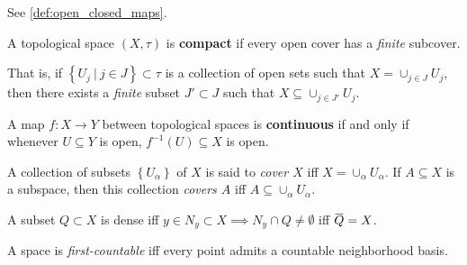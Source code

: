 \begin{definition}

See \cref{def:open_closed_maps}.

\end{definition}

\begin{definition}[Compact]

A topological space \((X, \tau)\) is \textbf{compact} if every open
cover has a \emph{finite} subcover.

That is, if
\(\left\{{U_{j} {~\mathrel{\Big|}~}j\in J}\right\} \subset \tau\) is a
collection of open sets such that \(X = \cup_{j\in J} U_{j}\), then
there exists a \emph{finite} subset \(J' \subset J\) such that
\(X \subseteq \cup_{j\in J'} U_{j}\).

\end{definition}

\begin{definition}

A map \(f:X\to Y\) between topological spaces is \textbf{continuous} if
and only if whenever \(U \subseteq Y\) is open,
\(f ^{-1} (U) \subseteq X\) is open.

\end{definition}

\begin{definition}[Cover]

A collection of subsets \(\left\{{U_\alpha}\right\}\) of \(X\) is said
to \emph{cover \(X\)} iff \(X = \cup_{\alpha} U_\alpha\). If
\(A\subseteq X\) is a subspace, then this collection \emph{covers \(A\)}
iff \(A\subseteq \cup_{\alpha} U_\alpha\).

\end{definition}

\begin{definition}[Dense]

A subset \(Q\subset X\) is dense iff
\(y\in N_{y} \subset X \implies N_{y} \cap Q \neq \emptyset\) iff
\(\mkern 1.5mu\overline{\mkern-1.5muQ\mkern-1.5mu}\mkern 1.5mu = X\).

\end{definition}

\begin{definition}

A space is \emph{first-countable} iff every point admits a countable
neighborhood basis.

\end{definition}

